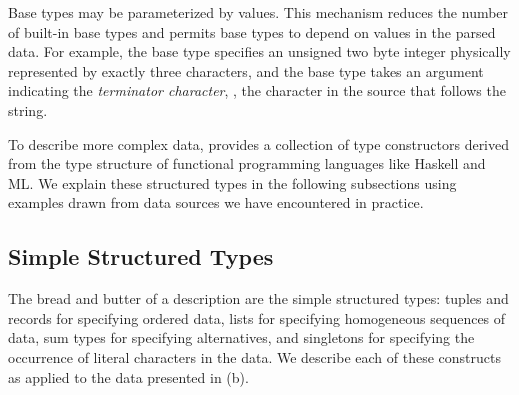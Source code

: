 \documentclass{sigplanconf}
\begin{document}
Base types may be parameterized by \ml{} values.  This mechanism
reduces the number of built-in base types and permits base types to
depend on values in the parsed data.  For example, the base type
 specifies an unsigned two byte integer physically
represented by exactly three characters, and the base type
 takes an argument indicating the \textit{terminator
character}, \ie{}, the character in the source that
follows the string.

To describe more complex data, \padsml{} provides a collection of type
constructors derived from the type structure of functional programming
languages like Haskell and ML.  We explain these structured types in
the following subsections using examples drawn from data sources we
have encountered in practice.


\subsection{Simple Structured Types}


The bread and butter of a \padsml{} description are the simple
structured types: tuples and records for specifying ordered data,
lists for specifying homogeneous sequences of data, sum types for
specifying alternatives, and singletons for specifying the occurrence
of literal characters in the data.  We describe each of these
constructs as applied to the \dibbler{} data presented in
(b).
\end{document}
